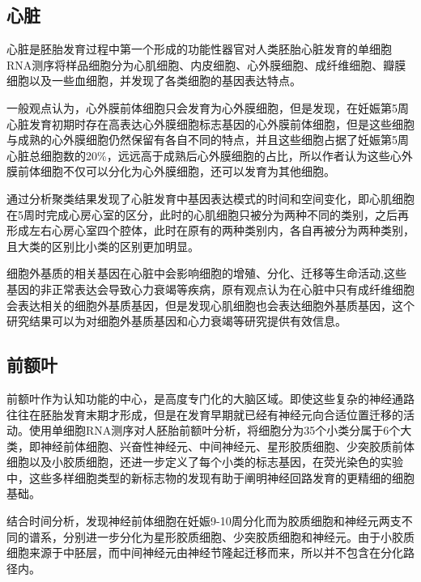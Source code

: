 \documentclass[lang=cn]{elegantpaper}
\begin{document}
\subsection{心脏}
心脏是胚胎发育过程中第一个形成的功能性器官\citep{buckingham_building_2005}对人类胚胎心脏发育的单细胞RNA测序将样品细胞分为心肌细胞、内皮细胞、心外膜细胞、成纤维细胞、瓣膜细胞以及一些血细胞，并发现了各类细胞的基因表达特点\citep{cui_single-cell_2019}。

一般观点认为，心外膜前体细胞只会发育为心外膜细胞\citep{wessels_epicardium_2004}，但是\cite{cui_single-cell_2019}发现，在妊娠第5周心脏发育初期时存在高表达心外膜细胞标志基因的心外膜前体细胞，但是这些细胞与成熟的心外膜细胞仍然保留有各自不同的特点，并且这些细胞占据了妊娠第5周心脏总细胞数的20\%，远远高于成熟后心外膜细胞的占比，所以作者认为这些心外膜前体细胞不仅可以分化为心外膜细胞，还可以发育为其他细胞。

\cite{cui_single-cell_2019}通过分析聚类结果发现了心脏发育中基因表达模式的时间和空间变化，即心肌细胞在5周时完成心房心室的区分，此时的心肌细胞只被分为两种不同的类别，之后再形成左右心房心室四个腔体，此时在原有的两种类别内，各自再被分为两种类别，且大类的区别比小类的区别更加明显。

细胞外基质的相关基因在心脏中会影响细胞的增殖、分化、迁移等生命活动\citep{doppler_cardiac_2017},这些基因的非正常表达会导致心力衰竭等疾病\citep{bassat_extracellular_2017}，原有观点认为在心脏中只有成纤维细胞会表达相关的细胞外基质基因\citep{lockhart_extracellular_2011}，但是\cite{cui_single-cell_2019}发现心肌细胞也会表达细胞外基质基因，这个研究结果可以为对细胞外基质基因和心力衰竭等研究提供有效信息。

\subsection{前额叶}
前额叶作为认知功能的中心，是高度专门化的大脑区域\citep{roth_evolution_2012}。即使这些复杂的神经通路往往在胚胎发育末期才形成，但是在发育早期就已经有神经元向合适位置迁移的活动\citep{orahilly_significant_2008}。\cite{zhong_single-cell_2018}使用单细胞RNA测序对人胚胎前额叶分析，将细胞分为35个小类分属于6个大类，即神经前体细胞、兴奋性神经元、中间神经元、星形胶质细胞、少突胶质前体细胞以及小胶质细胞，还进一步定义了每个小类的标志基因，在荧光染色的实验中，这些多样细胞类型的新标志物的发现有助于阐明神经回路发育的更精细的细胞基础。

结合时间分析，\cite{zhong_single-cell_2018}发现神经前体细胞在妊娠9-10周分化而为胶质细胞和神经元两支不同的谱系，分别进一步分化为星形胶质细胞、少突胶质细胞和神经元。由于小胶质细胞来源于中胚层\citep{trapnell_dynamics_2014}，而中间神经元由神经节隆起迁移而来\citep{ma_subcortical_2013}，所以并不包含在分化路径内。
\end{document}
